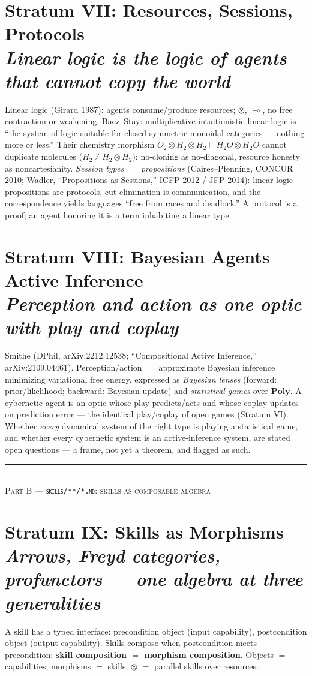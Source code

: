\documentclass[11pt]{article}
\theoremstyle{plain}
\theoremstyle{definition}
\theoremstyle{remark}
\newcommand{\Poly}{\mathbf{Poly}}
\newcommand{\stratum}[2]{\section{#1\\ {\normalsize\normalfont\itshape #2}}}
\begin{document}
\stratum{Stratum VII: Resources, Sessions, Protocols}{Linear logic is the logic of agents that cannot copy the world}

Linear logic (Girard 1987): agents consume/produce resources; $\otimes$, $\multimap$, no free contraction or weakening. Baez--Stay: multiplicative intuitionistic linear logic is ``the system of logic suitable for closed symmetric monoidal categories --- nothing more or less.'' Their chemistry morphism $O_2 \otimes H_2 \otimes H_2 \vdash H_2O \otimes H_2O$ cannot duplicate molecules ($H_2 \nvdash H_2 \otimes H_2$): no-cloning as no-diagonal, resource honesty as noncartesianity. \emph{Session types $=$ propositions} (Caires--Pfenning, CONCUR 2010; Wadler, ``Propositions as Sessions,'' ICFP 2012 / JFP 2014): linear-logic propositions are protocols, cut elimination is communication, and the correspondence yields languages ``free from races and deadlock.'' A protocol is a proof; an agent honoring it is a term inhabiting a linear type.

\stratum{Stratum VIII: Bayesian Agents --- Active Inference}{Perception and action as one optic with play and coplay}

Smithe (DPhil, arXiv:2212.12538; ``Compositional Active Inference,'' arXiv:2109.04461). Perception/action $=$ approximate Bayesian inference minimizing variational free energy, expressed as \emph{Bayesian lenses} (forward: prior/likelihood; backward: Bayesian update) and \emph{statistical games} over $\Poly$. A cybernetic agent is an optic whose play predicts/acts and whose coplay updates on prediction error --- the identical play/coplay of open games (Stratum VI). Whether \emph{every} dynamical system of the right type is playing a statistical game, and whether every cybernetic system is an active-inference system, are stated open questions --- a frame, not yet a theorem, and flagged as such.

\begin{center}\color{silmaril}\rule{0.25\textwidth}{0.4pt}\\[0.3em]\textsc{Part B --- \texttt{skills/**/*.md}: skills as composable algebra}\end{center}

\stratum{Stratum IX: Skills as Morphisms}{Arrows, Freyd categories, profunctors --- one algebra at three generalities}

A skill has a typed interface: precondition object (input capability), postcondition object (output capability). Skills compose when postcondition meets precondition: \textbf{skill composition $=$ morphism composition}. Objects $=$ capabilities; morphisms $=$ skills; $\otimes$ $=$ parallel skills over resources.
\end{document}
